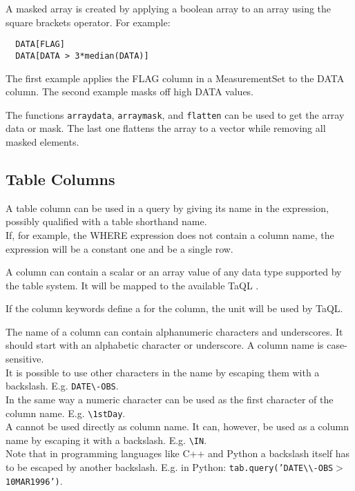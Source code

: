 A masked array is created by applying a boolean array to an array
using the square brackets operator. For example:
\begin{verbatim}
  DATA[FLAG]
  DATA[DATA > 3*median(DATA)]
\end{verbatim}
The first example applies the FLAG column in a MeasurementSet to the
DATA column.
The second example masks off high DATA values.

The functions \texttt{arraydata}, \texttt{arraymask}, and \texttt{flatten}
can be used to get the array data or mask. The last one flattens the
array to a vector while removing all masked elements.


\subsection{\label{TAQL:COLUMNS}Table Columns}
A table column can be used in a query by giving its name in the
expression, possibly qualified with a table shorthand name.
\\If, for example, the WHERE expression does not contain a column
name, the expression will be a constant one and be a single row.

A column can contain a scalar or an array value of any data type
supported by the table system. It will be mapped to the available TaQL
.

If the column keywords define a  for the
column, the unit will be used by TaQL.

The name of a column can contain alphanumeric characters and underscores.
It should start with an alphabetic character or underscore.
A column name is case-sensitive.
\\It is possible to use other characters in the name by
escaping them with a backslash. E.g. \texttt{DATE}\verb+\+\texttt{-OBS}.
\\In the same way a numeric character can be used as the first
character of the column name. E.g. \verb+\+\texttt{1stDay}.
\\
A   cannot
be used directly as column name.
It can, however, be used as a column name by escaping
it with a backslash. E.g. \verb+\+\texttt{IN}.
\\Note that in programming languages like C++ and Python a backslash
itself has to be escaped by another backslash. E.g. in Python:
\texttt{tab.query('DATE}\verb+\\+\texttt{-OBS$>$10MAR1996')}.

